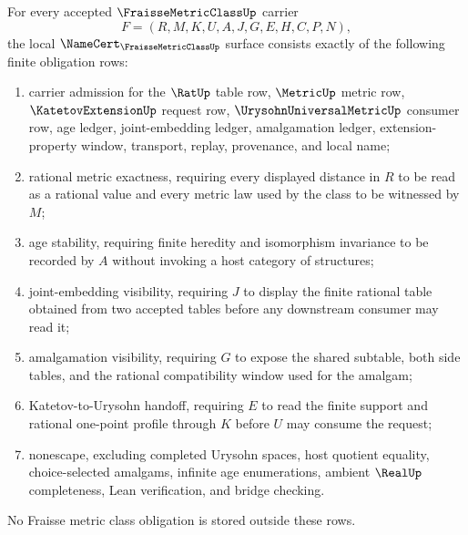 \begin{theorem}
\label{thm:fraisse-metric-class-namecert-obligations}
For every accepted $\FraisseMetricClassUp$ carrier
$$
F=(R,M,K,U,A,J,G,E,H,C,P,N),
$$
the local $\NameCert_{\FraisseMetricClassUp}$ surface consists exactly of the following finite obligation rows:
\begin{enumerate}
\item carrier admission for the $\RatUp$ table row, $\MetricUp$ metric row, $\KatetovExtensionUp$ request row, $\UrysohnUniversalMetricUp$ consumer row, age ledger, joint-embedding ledger, amalgamation ledger, extension-property window, transport, replay, provenance, and local name;
\item rational metric exactness, requiring every displayed distance in $R$ to be read as a rational value and every metric law used by the class to be witnessed by $M$;
\item age stability, requiring finite heredity and isomorphism invariance to be recorded by $A$ without invoking a host category of structures;
\item joint-embedding visibility, requiring $J$ to display the finite rational table obtained from two accepted tables before any downstream consumer may read it;
\item amalgamation visibility, requiring $G$ to expose the shared subtable, both side tables, and the rational compatibility window used for the amalgam;
\item Katetov-to-Urysohn handoff, requiring $E$ to read the finite support and rational one-point profile through $K$ before $U$ may consume the request;
\item nonescape, excluding completed Urysohn spaces, host quotient equality, choice-selected amalgams, infinite age enumerations, ambient $\RealUp$ completeness, Lean verification, and bridge checking.
\end{enumerate}
No Fraisse metric class obligation is stored outside these rows.
\end{theorem}
